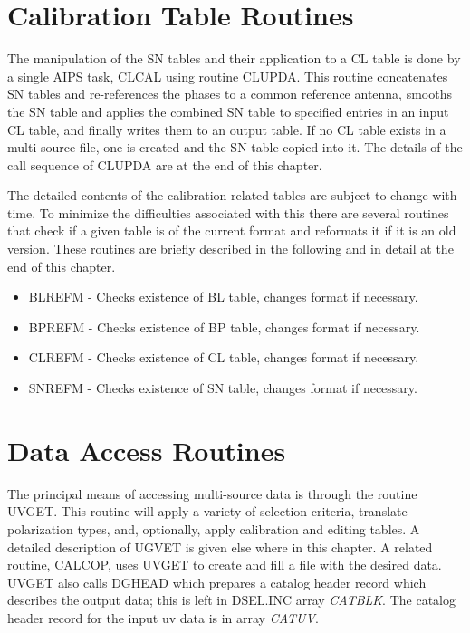 \section{Calibration Table Routines }

The manipulation of the SN tables and their application to a CL table
is done by a single AIPS task, CLCAL using routine CLUPDA. This
routine concatenates SN tables and re-references the phases to a
common reference antenna, smooths the SN table and applies the
combined SN table to specified entries in an input CL table, and
finally writes them to an output table.  If no CL table exists in a
multi-source file, one is created and the SN table copied into it.
The details of the call sequence of CLUPDA are at the end of this
chapter.

   The detailed contents of the calibration related tables are subject
to change with time.  To minimize the difficulties associated with
this there are several routines that check if a given table is of the
current format and reformats it if it is an old version.  These
routines are briefly described in the following  and in detail at the
end of this chapter.
\begin{itemize} %
\item BLREFM -  Checks existence of BL table, changes
format if necessary.
\item BPREFM - Checks existence of BP table, changes
format if necessary.
\item CLREFM - Checks existence of CL table, changes
format if necessary.
\item SNREFM - Checks existence of SN table, changes
format if necessary.
\end{itemize} %

\section{Data Access Routines }
The principal means of accessing multi-source data is through the
routine UVGET.  This routine will apply a variety of
selection criteria, translate polarization types, and, optionally,
apply calibration and editing tables.  A detailed description of UGVET
is given else where in this chapter.  A related routine,
CALCOP, uses UVGET to create and fill a file with the
desired data. UVGET also calls DGHEAD which prepares a
catalog header record which describes the output data; this is left in
DSEL.INC array {\it CATBLK}.  The catalog header record for the input
uv data is in array {\it CATUV}.


